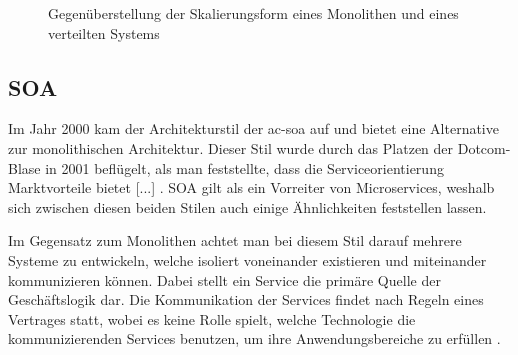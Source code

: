 \begin{figure}[!ht]
            \caption{Gegenüberstellung der Skalierungsform eines Monolithen und eines verteilten Systems}
            \label{fig:monservscaling}
        \end{figure}


    \subsection{SOA}
    \label{subsec:soa}
    Im Jahr 2000 kam der Architekturstil der \acrlong{ac-soa} auf und bietet eine Alternative zur monolithischen Architektur. Dieser Stil \glqq [...] wurde durch das Platzen der Dotcom-Blase in 2001 beflügelt, als man feststellte, dass die Serviceorientierung Marktvorteile bietet [...]\grqq{} \parencite[S. 12]{takai2017architektur}. SOA gilt als ein Vorreiter von Microservices, weshalb sich zwischen diesen beiden Stilen auch einige Ähnlichkeiten feststellen lassen.
    
    Im Gegensatz zum Monolithen achtet man bei diesem Stil darauf mehrere Systeme zu entwickeln, welche isoliert voneinander existieren und miteinander kommunizieren können. Dabei stellt ein Service die primäre Quelle der Geschäftslogik dar. Die Kommunikation der Services findet nach Regeln eines Vertrages statt, wobei es keine Rolle spielt, welche Technologie die kommunizierenden Services benutzen, um ihre Anwendungsbereiche zu erfüllen \parencites[S. 12]{takai2017architektur}{erl2005soa}{newman2019monolith}[S. 22]{gallipeau2018microservices}.
    
